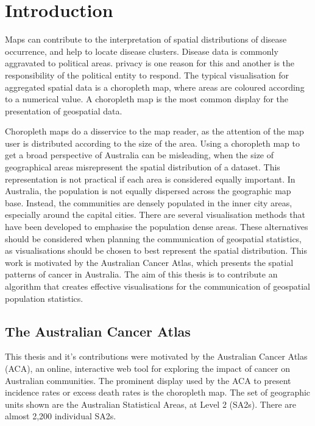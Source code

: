 \documentclass{monashthesis}
\begin{document}
\hypertarget{ch:intro}{%
\chapter{Introduction}\label{ch:intro}}

Maps can contribute to the interpretation of spatial distributions of disease occurrence, and help to locate disease clusters. Disease data is commonly aggravated to political areas. privacy is one reason for this and another is the responsibility of the political entity to respond. The typical visualisation for aggregated spatial data is a choropleth map, where areas are coloured according to a numerical value. A choropleth map is the most common display for the presentation of geospatial data.

Choropleth maps do a disservice to the map reader, as the attention of the map user is distributed according to the size of the area. Using a choropleth map to get a broad perspective of Australia can be misleading, when the size of geographical areas misrepresent the spatial distribution of a dataset. This representation is not practical if each area is considered equally important. In Australia, the population is not equally dispersed across the geographic map base.
Instead, the communities are densely populated in the inner city areas, especially around the capital cities. There are several visualisation methods that have been developed to emphasise the population dense areas. These alternatives should be considered when planning the communication of geospatial statistics, as visualisations should be chosen to best represent the spatial distribution. This work is motivated by the Australian Cancer Atlas, which presents the spatial patterns of cancer in Australia. The aim of this thesis is to contribute an algorithm that creates effective visualisations for the communication of geospatial population statistics.

\hypertarget{the-australian-cancer-atlas}{%
\section{The Australian Cancer Atlas}\label{the-australian-cancer-atlas}}

This thesis and it's contributions were motivated by the Australian Cancer Atlas (ACA), an online, interactive web tool for exploring the impact of cancer on Australian communities. The prominent display used by the ACA to present incidence rates or excess death rates is the choropleth map. The set of geographic units shown are the Australian Statistical Areas, at Level 2 (SA2s). There are almost 2,200 individual SA2s.
\end{document}
